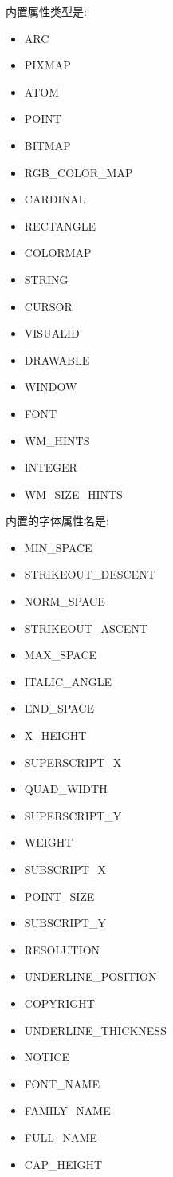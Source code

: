 内置属性类型是:
\begin{itemize}
	\item ARC
	\item PIXMAP
	\item ATOM
	\item POINT
	\item BITMAP
	\item RGB\_COLOR\_MAP
	\item CARDINAL
	\item RECTANGLE
	\item COLORMAP
	\item STRING
	\item CURSOR
	\item VISUALID
	\item DRAWABLE
	\item WINDOW
	\item FONT
	\item WM\_HINTS
	\item INTEGER
	\item WM\_SIZE\_HINTS
\end{itemize}

内置的字体属性名是:

\begin{itemize}
	\item MIN\_SPACE
	\item STRIKEOUT\_DESCENT
	\item NORM\_SPACE
	\item STRIKEOUT\_ASCENT
	\item MAX\_SPACE
	\item ITALIC\_ANGLE
	\item END\_SPACE
	\item X\_HEIGHT
	\item SUPERSCRIPT\_X
	\item QUAD\_WIDTH
	\item SUPERSCRIPT\_Y
	\item WEIGHT
	\item SUBSCRIPT\_X
	\item POINT\_SIZE
	\item SUBSCRIPT\_Y
	\item RESOLUTION
	\item UNDERLINE\_POSITION
	\item COPYRIGHT
	\item UNDERLINE\_THICKNESS
	\item NOTICE
	\item FONT\_NAME
	\item FAMILY\_NAME
	\item FULL\_NAME
	\item CAP\_HEIGHT
\end{itemize}

